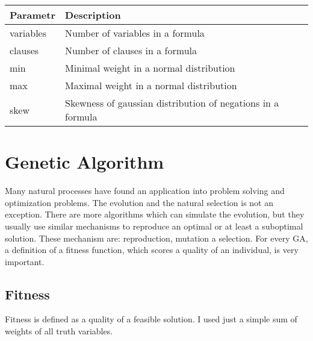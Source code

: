 \documentclass{article}
\begin{document}
	\begin{table}[ht]
		\centering
		\begin{tabular}{|l|l|}
		\hline
		\textbf{Parametr} & \textbf{Description} \\ \hline
		\-\-variables       & Number of variables in a formula                  \\ \hline
		\-\-clauses         & Number of clauses in a formula                    \\ \hline
		\-\-min         	  & Minimal weight in a normal distribution                     \\ \hline
		\-\-max             & Maximal weight in a normal distribution                     \\ \hline
		\-\-skew            & Skewness of gaussian distribution of negations in a formula                      \\ \hline
		\end{tabular}
	\end{table}

\section{Genetic Algorithm}
	Many natural processes have found an application into problem solving and optimization problems. The evolution and the natural selection is not an exception. There are more algorithms which can simulate the evolution, but they usually use similar mechanisms to reproduce an optimal or at least a suboptimal solution. These mechanism are: reproduction, mutation a selection. For every GA, a definition of a fitness function, which scores a quality of an individual, is very important.


	\subsection{Fitness}
	Fitness is defined as a quality of a feasible solution. I used just a simple sum of weights of all truth variables.
\end{document}
